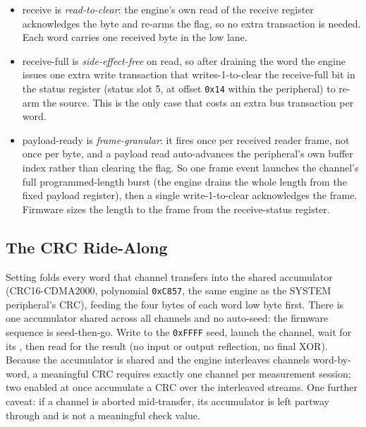 \begin{itemize}
	\item {} receive is \emph{read-to-clear}: the engine's own read of the receive register acknowledges the byte and re-arms the flag, so no extra transaction is needed. Each word carries one received byte in the low lane.
	\item {} receive-full is \emph{side-effect-free} on read, so after draining the word the engine issues one extra write transaction that writes-1-to-clear the receive-full bit in the  status register (status slot 5, at offset \texttt{0x14} within the peripheral) to re-arm the source. This is the only case that costs an extra bus transaction per word.
	\item {} payload-ready is \emph{frame-granular}: it fires once per received reader frame, not once per byte, and a payload read auto-advances the peripheral's own buffer index rather than clearing the flag. So one frame event launches the channel's full programmed-length burst (the engine drains the whole length from the fixed payload register), then a single write-1-to-clear acknowledges the frame. Firmware sizes the length to the frame from the  receive-status register.
\end{itemize}

\subsection{The CRC Ride-Along}

Setting  folds every word that channel transfers into the shared  accumulator (\mbox{CRC16-CDMA2000}, polynomial \texttt{0xC857}, the same engine as the SYSTEM peripheral's CRC), feeding the four bytes of each word low byte first. There is one accumulator shared across all channels and no auto-seed: the firmware sequence is seed-then-go. Write  to the \texttt{0xFFFF} seed, launch the channel, wait for its , then read  for the result (no input or output reflection, no final XOR). Because the accumulator is shared and the engine interleaves channels word-by-word, a meaningful CRC requires exactly one  channel per measurement session; two enabled at once accumulate a CRC over the interleaved streams. One further caveat: if a  channel is aborted mid-transfer, its accumulator is left partway through and is not a meaningful check value.

